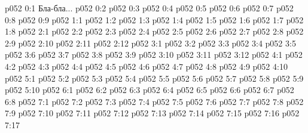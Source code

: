 \author{Могущественный Посланник}
\vs p052 0:1  Бла-бла...
\vs p052 0:2 
\vs p052 0:3 
\vs p052 0:4 
\vs p052 0:5 
\vs p052 0:6 
\vs p052 0:7 
\vs p052 0:8 
\vs p052 0:9 \pc 
{}
\vs p052 1:1 
\vs p052 1:2 
\vs p052 1:3 \pc 
\vs p052 1:4 
\vs p052 1:5 \pc 
\vs p052 1:6 \pc 
\vs p052 1:7 
\vs p052 1:8 \pc 
{}
\vs p052 2:1 
\vs p052 2:2 
\vs p052 2:3 
\vs p052 2:4 
\vs p052 2:5 \pc 
\vs p052 2:6 
\vs p052 2:7 
\vs p052 2:8 
\vs p052 2:9 \pc 
\vs p052 2:10 
\vs p052 2:11 
\vs p052 2:12 
\vs p052 3:1 
\vs p052 3:2 
\vs p052 3:3 \pc 
\vs p052 3:4 \pc 
\vs p052 3:5 
\vs p052 3:6 
\vs p052 3:7 
\vs p052 3:8 \pc 
\vs p052 3:9 
\vs p052 3:10 \pc 
\vs p052 3:11 
\vs p052 3:12 
\vs p052 4:1 
\vs p052 4:2 \pc 
\vs p052 4:3 
\vs p052 4:4 
\vs p052 4:5 \pc 
\vs p052 4:6 
\vs p052 4:7 
\vs p052 4:8 
\vs p052 4:9 \pc 
\vs p052 4:10 \pc 
{}
\vs p052 5:1 
\vs p052 5:2 
\vs p052 5:3 \pc 
\vs p052 5:4 
\vs p052 5:5 
\vs p052 5:6 \pc 
\vs p052 5:7 
\vs p052 5:8 \pc 
\vs p052 5:9 
\vs p052 5:10 
\vs p052 6:1 
\vs p052 6:2 
\vs p052 6:3 
\vs p052 6:4 
\vs p052 6:5 
\vs p052 6:6 
\vs p052 6:7 
\vs p052 6:8 \pc 
{}
\vs p052 7:1 
\vs p052 7:2 
\vs p052 7:3 \pc 
\vs p052 7:4 
\vs p052 7:5 \pc 
\vs p052 7:6 
\vs p052 7:7 \pc 
\vs p052 7:8 \pc 
\vs p052 7:9 
\vs p052 7:10 \pc 
\vs p052 7:11 
\vs p052 7:12 
\vs p052 7:13 
\vs p052 7:14 \pc 
\vs p052 7:15 
\vs p052 7:16 \pc 
\vsetoff
\vs p052 7:17 
\quizlink
